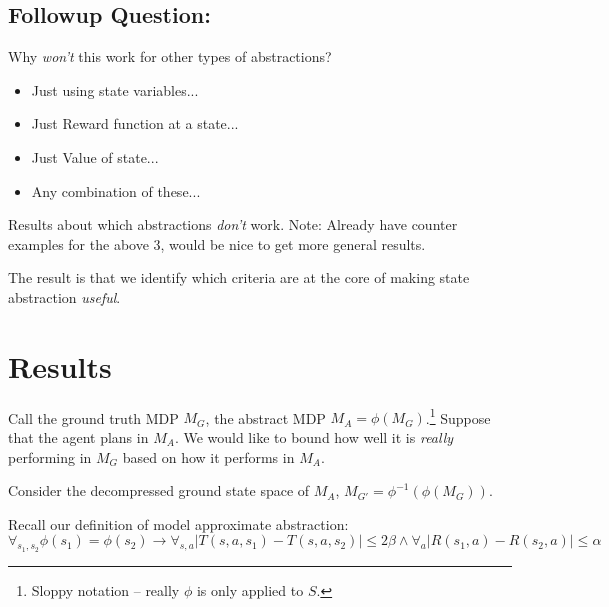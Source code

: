\documentclass[11pt]{amsart}
\begin{document}
\subsection{Followup Question:} Why {\it won't} this work for other types of abstractions?
\begin{itemize}
\item Just using state variables...
\item Just Reward function at a state...
\item Just Value of state...
\item Any combination of these...
\end{itemize}

Results about which abstractions {\it don't} work. Note: Already have counter examples for the above 3, would be nice to get more general results.

The result is that we identify which criteria are at the core of making state abstraction {\it useful}.



\newpage
\section{Results}


Call the ground truth MDP $M_G$, the abstract MDP $M_A=\phi(M_G)$.\footnote{Sloppy notation -- really $\phi$ is only applied to $S$.} Suppose that the agent plans in $M_A$. We would like to bound how well it is \textit{really} performing in $M_G$ based on how it performs in $M_A$. 

Consider the decompressed ground state space of $M_A$, $M_{G'} = \phi^{-1}(\phi(M_G))$.


 Recall our definition of model approximate abstraction:
\begin{equation}
\forall_{s_1,s_2} \phi(s_1) = \phi(s_2) \rightarrow \forall_{s,a} | T(s,a,s_1) - T(s,a,s_2) | \leq 2\beta \wedge \forall_a |R(s_1,a) - R(s_2,a)| \leq \alpha
\label{eq:approx_model_abs}
\end{equation}
\end{document}
